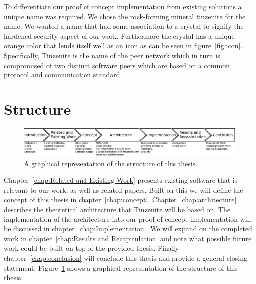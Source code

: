 To differentiate our proof of concept implementation from existing solutions a unique name was required.
We chose the rock-forming mineral tinzenite for the name.
We wanted a name that had some association to a crystal to signify the hardened security aspect of our work.
Furthermore the crystal has a unique orange color that lends itself well as an icon as can be seen in figure~\ref{fig:icon}.
Specifically, Tinzenite is the name of the peer network which in turn is compromised of two distinct software peers which are based on a common protocol and communication standard.

\section{Structure}
\label{sec:Structure}

\begin{figure}[htp]
\centering
    \includegraphics[width=\linewidth]{diagram/thesis_structure}
\caption[Thesis Structure Diagram]{A graphical representation of the structure of this thesis.}
\label{fig:thesis_structure}
\end{figure}

Chapter~\ref{chap:Related and Existing Work} presents existing software that is relevant to our work, as well as related papers.
Built on this we will define the concept of this thesis in chapter~\ref{chap:concept}.
Chapter~\ref{chap:architecture} describes the theoretical architecture that Tinzenite will be based on.
The implementation of the architecture into our proof of concept implementation will be discussed in chapter~\ref{chap:Implementation}.
We will expand on the completed work in chapter~\ref{chap:Results and Recapitulation} and note what possible future work could be built on top of the provided thesis.
Finally chapter~\ref{chap:conclusion} will conclude this thesis and provide a general closing statement.
Figure~\ref{fig:thesis_structure} shows a graphical representation of the structure of this thesis.
